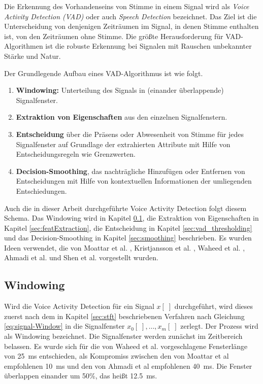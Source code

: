 Die Erkennung des Vorhandenseins von Stimme in einem Signal wird als \emph{Voice Activity Detection (VAD)} oder auch \emph{Speech Detection} bezeichnet. Das Ziel ist die Unterscheidung von denjenigen Zeiträumen im Signal, in denen Stimme enthalten ist, von den Zeiträumen ohne Stimme. Die größte Herausforderung für VAD-Algorithmen ist die robuste Erkennung bei Signalen mit Rauschen unbekannter Stärke und Natur. \cite[S. 1]{vad_kola} \cite[S. 1]{vad_Lisboa}

Der Grundlegende Aufbau eines VAD-Algorithmus ist wie folgt.
\begin{enumerate}
\item \textbf{Windowing:} Unterteilung des Signals in (einander überlappende) Signalfenster.
\item \textbf{Extraktion von Eigenschaften} aus den einzelnen Signalfenstern.
\item \textbf{Entscheidung} über die Präsens oder Abwesenheit von Stimme für jedes Signalfenster auf Grundlage der extrahierten Attribute mit Hilfe von Entscheidungsregeln wie Grenzwerten.
\item \textbf{Decision-Smoothing}, das nachträgliche Hinzufügen oder Entfernen von Entscheidungen mit Hilfe von kontextuellen Informationen der umliegenden Entschiedungen.\cite[S. 8 - 9]{vad_granada} \cite[S. 1 - 2]{vad_kola}
\end{enumerate}

Auch die in dieser Arbeit durchgeführte Voice Activity Detection folgt diesem Schema. Das Windowing wird in Kapitel \ref{sec:windowing}, die Extraktion von Eigenschaften in Kapitel \ref{sec:featExtraction}, die Entscheidung in Kapitel \ref{sec:vad_thresholding} und das Decision-Smoothing in Kapitel \ref{sec:smoothing} beschrieben. Es wurden Ideen verwendet, die von  Moattar et al. \cite{vad_Easy}, Kristjansson et al. \cite{vad_Lisboa}, Waheed et al. \cite{vad_entropy}, Ahmadi et al. \cite{vad_ceps} und Shen et al.\cite{vad_entropie02} vorgestellt wurden.

\subsection{Windowing}
\label{sec:windowing}

Wird die Voice Activity Detection für ein Signal $x[\;]$ durchgeführt, wird dieses zuerst nach dem in Kapitel \ref{sec:stft} beschriebenen Verfahren nach Gleichung \ref{eq:signal-Window} in die Signalfenster $x_0[\;] , \ldots , x_m[\;]$ zerlegt. Der Prozess wird als \glqq Windowing\grqq{} bezeichnet. Die Signalfenster werden zunächst im Zeitbereich belassen. Es wurde sich für die von Waheed et al. \cite{vad_entropy} vorgeschlagene Fensterlänge von \SI{25}{\milli\second} entschieden, als Kompromiss zwischen den von Moattar et al\cite{vad_Easy} empfohlenen \SI{10}{\milli\second} und den von Ahmadi et al \cite{vad_ceps} empfohlenen \SI{40}{\milli\second}. Die Fenster überlappen einander um 50\%, das heißt \SI{12.5}{\milli\second}.

